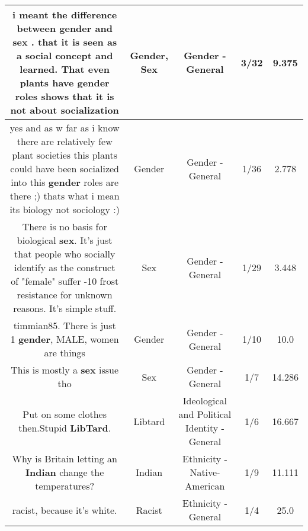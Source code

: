 \documentclass[11pt]{article}
\newlength\mylength
\begin{document}
\begin{center}
\begin{longtable}{|C{.65\mylength}|C{.30\mylength}|C{.12\mylength}|C{.12\mylength}|C{.12\mylength}|}
  \small i meant the difference between  \textbf{gender}  and \textbf{sex} . that it is seen as a social concept and  learned. That even plants have  \textbf{gender} roles shows that it is not about  socialization\normalsize   & Gender, Sex & Gender - General & 3/32 & 9.375 \\  \hline
  \small yes   and   as w far as i  know  there are relatively few plant societies this plants  could have been socialized into  this \textbf{gender} roles  are there ;)    thats what i mean its biology  not sociology :)\normalsize   & Gender & Gender - General & 1/36 & 2.778 \\  \hline
  \small There is no basis for biological \textbf{sex}. It's just that people who socially identify as the construct of "female" suffer -10 frost resistance for unknown reasons. It's simple stuff.\normalsize   & Sex & Gender - General & 1/29 & 3.448 \\  \hline
  \small timmian85. There is just 1 \textbf{gender}, MALE, women are things\normalsize   & Gender & Gender - General & 1/10 & 10.0 \\  \hline
  \small This is mostly a \textbf{sex} issue tho\normalsize   & Sex & Gender - General & 1/7 & 14.286 \\  \hline
  \small Put on some clothes then.Stupid \textbf{LibTard}.\normalsize   & Libtard &  Ideological and Political Identity - General & 1/6 & 16.667 \\  \hline
  \small Why is Britain letting an \textbf{Indian} change the temperatures?\normalsize   & Indian & Ethnicity - Native-American & 1/9 & 11.111 \\  \hline
  \small racist, because it's white.\normalsize   & Racist & Ethnicity - General & 1/4 & 25.0 \\  \hline

\end{longtable}
\end{center}
\end{document}
